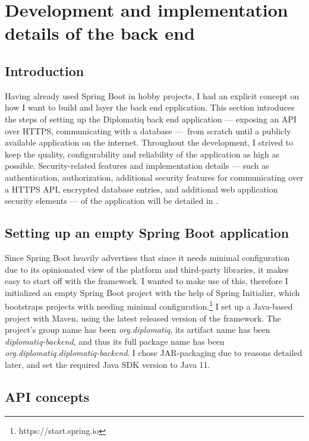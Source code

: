 \section{Development and implementation details of the back end}

\subsection{Introduction}

Having already used Spring Boot in hobby projects, I had an explicit concept on how I want to build and layer the back end epplication. This section introduces the steps of setting up the Diplomatiq back end application — exposing an API over HTTPS, communicating with a database — from scratch until a publicly available application on the internet. Throughout the development, I strived to keep the quality, configurability and reliability of the application as high as possible. Security-related features and implementation details — such as authentication, authorization, additional security features for communicating over a HTTPS API, encrypted database entries, and additional web application security elements — of the application will be detailed in .

\subsection{Setting up an empty Spring Boot application}

Since Spring Boot heavily advertises that since it needs minimal configuration due to its opinionated view of the platform and third-party libraries, it makes easy to start off with the framework. I wanted to make use of this, therefore I initialized an empty Spring Boot project with the help of Spring Initializr, which bootstraps projects with needing minimal configuration.\footnote{https://start.spring.io} I set up a Java-based project with Maven, using the latest released version of the framework. The project's group name has been \emph{org.diplomatiq}, its artifact name has been \emph{diplomatiq-backend}, and thus its full package name has been \emph{org.diplomatiq.diplomatiq-backend}. I chose JAR-packaging due to reasons detailed later, and set the required Java SDK version to Java 11.

\subsection{API concepts}

